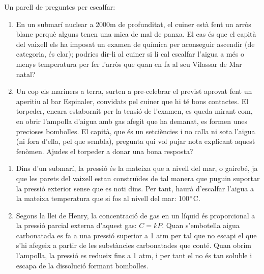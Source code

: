 \documentclass[11pt]{article}
\begin{document}
{Un parell de preguntes per escalfar: 
\begin{enumerate}[label=\emph{\alph*})]
\item En un submarí nuclear a 2000m de profunditat, el cuiner està fent un arròs blanc perquè alguns tenen una mica de mal de panxa. El cas és que el capità del vaixell els ha imposat un examen de química per aconseguir ascendir (de categoria, és clar); podries dir-li al cuiner si li cal escalfar l'aigua a més o menys temperatura per fer l'arròs que quan en fa al seu Vilassar de Mar natal?
\item Un cop els mariners a terra, surten a pre-celebrar el previst aprovat fent un aperitiu al bar Espinaler, convidats pel cuiner que hi té bons contactes. El torpeder, encara estabornit per la tensió de l'examen, es queda mirant com, en obrir l'ampolla d'aigua amb gas afegit que ha demanat, es formen unes precioses bombolles. El capità, que és un setciències i no calla ni sota l'aigua (ni fora d'ella, pel que sembla), pregunta qui vol pujar nota explicant aquest fenòmen. Ajudes el torpeder a donar una bona resposta? 
\end{enumerate}
}
{
\vfill
\newpage
}
{
\begin{enumerate}[label=\emph{\alph*})]
\item Dins d'un submarí, la pressió és la mateixa que a nivell del mar, o gairebé, ja que les parets del vaixell estan construïdes de tal manera que puguin suportar la pressió exterior sense que es noti dins. Per tant, haurà d'escalfar l'aigua a la mateixa temperatura que si fos al nivell del mar: 100$\degree$C.
\item Segons la llei de Henry, la concentració de gas en un líquid és proporcional a la pressió parcial externa d'aquest gas: $C=kP$. Quan s'embotella  aigua carbonatada es fa a una pressió superior a 1 atm per tal que no escapi el  que s'hi afegeix a partir de les substàncies carbonatades que conté. Quan obrim l'ampolla, la pressió es redueix fins a 1 atm, i per tant el  no és tan soluble i escapa de la dissolució formant bombolles. 
\end{enumerate}
}
\end{document}
